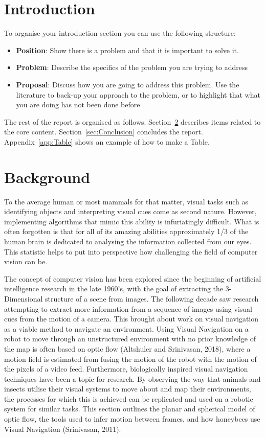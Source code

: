 \documentclass{UoNMCHA}
\numberwithin{equation}{section}
\begin{document}
\section{Introduction}
To organise your introduction section you can use the following structure:
\begin{itemize}
    \item \textbf{Position}: Show there is a problem and that it is important to solve it.
    \item \textbf{Problem}: Describe the specifics of the problem you are trying to address
    \item \textbf{Proposal}: Discuss how you are going to address this problem. Use the literature to back-up your approach to the problem, or to highlight that what you are doing has not been done before
\end{itemize}

The rest of the report is organised as follows. Section~\ref{sec:Background} describes items related to the core content. Section~\ref{sec:Conclusion} concludes the report. Appendix~\ref{app:Table} shows an example of how to make a Table.

\section{Background}\label{sec:Background} %
To the average human or most mammals for that matter, visual tasks such as identifying objects and interpreting visual cues come as second nature. However, implementing algorithms that mimic this ability is infuriatingly difficult. What is often forgotten is that for all of its amazing abilities approximately 1/3 of the human brain is dedicated to analysing the information collected from our eyes. This statistic helps to put into perspective how challenging the field of computer vision can be.

The concept of computer vision has been explored since the beginning of artificial intelligence research in the late 1960’s, with the goal of extracting the 3-Dimensional structure of a scene from images. The following decade saw research attempting to extract more information from a sequence of images using visual cues from the motion of a camera. This brought about work on visual navigation as a viable method to navigate an environment. Using Visual Navigation on a robot to move through an unstructured environment with no prior knowledge of the map is often based on optic flow (Altshuler and Srinivasan, 2018), where a motion field is estimated from fusing the motion of the robot with the motion of the pixels of a video feed. Furthermore, biologically inspired visual navigation techniques have been a topic for research. By observing the way that animals and insects utilise their visual systems to move about and map their environments, the processes for which this is achieved can be replicated and used on a robotic system for similar tasks. This section outlines the planar and spherical model of optic flow, the tools used to infer motion between frames, and how honeybees use Visual Navigation (Srinivasan, 2011).
\end{document}
